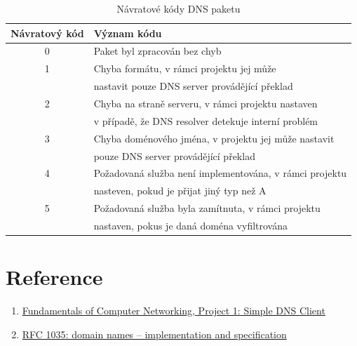 \documentclass[a4paper, 11pt]{article}
\begin{document}
\begin{table}[h]
\centering
\begin{tabular}{cl}
\textbf{Návratový kód} & \textbf{Význam kódu}                                                                                            \\ \hline
0             & Paket byl zpracován bez chyb                                                                           \\ \hline
1             & Chyba formátu, v rámci projektu jej může \\& nastavit pouze DNS server provádějící překlad                 \\ \hline
2             & Chyba na straně serveru, v rámci projektu nastaven \\& v případě, že DNS resolver detekuje interní problém \\ \hline
3             & Chyba doménového jména, v projektu jej může nastavit \\& pouze DNS server provádějící překlad              \\ \hline
4             & Požadovaná služba není implementována, v rámci projektu \\& nasteven, pokud je přijat jiný typ než A       \\ \hline
5             & Požadovaná služba byla zamítnuta, v rámci projektu \\& nastaven, pokus je daná doména vyfiltrována        
\end{tabular}
\caption{Návratové kódy DNS paketu}
\label{tab:2}
\end{table}

\section{Reference}
\begin{enumerate}
\item \href{https://mislove.org/teaching/cs4700/spring11/handouts/project1-primer.pdf}{Fundamentals of Computer Networking, Project 1: Simple DNS Client}
\item \href{https://tools.ietf.org/html/rfc1035}{RFC 1035: domain names -- implementation and specification}
\end{enumerate}
\end{document}
